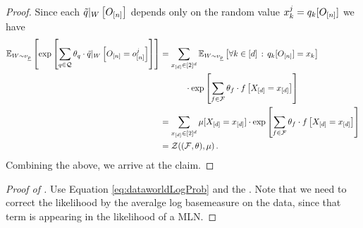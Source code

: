 \begin{proof}
	Since each ${\tilde{q}}|_{W} \left[O_{[n]}\right]$ depends only on the random value $x_{k}^j=q_{k}[O_{[n]}]$ we have
	\begin{align*}
		\mathbb{E}_{W\sim\nu_{\underline{p}}}\left[
			\mathrm{exp}\left[ \sum_{q\in\mathcal{Q}} \theta_{q} \cdot {\tilde{q}}|_{W} \left[O_{[n]} = o_{[n]}^{j}\right] \right] 
		\right] 
		& = \sum_{x_{[d]} \in [2]^d} 
		\mathbb{E}_{W\sim\nu_{\underline{p}}}\left[\forall {k\in[d]} \, : \, q_{k}[O_{[n]}]=x_{k}\right] \\
		& \quad \quad \quad  \cdot 
		\mathrm{exp}\left[\sum_{f\in\mathcal{F}} \theta_{f} \cdot f\left[X_{[d]}=x_{[d]}\right]\right]
		 \\
		& = \sum_{x_{[d]} \in [2]^d} \mu[X_{[d]}=x_{[d]}] \cdot 
		\mathrm{exp}\left[\sum_{f\in\mathcal{F}} \theta_{f} \cdot f\left[X_{[d]}=x_{[d]}\right]\right]
		 \\
		& = \mathcal{Z}{\left((\mathcal{F},\theta), \mu\right)} \, . 
	\end{align*}
	Combining the above, we arrive at the claim.
\end{proof}

\begin{proof}[Proof of ]
	Use Equation \ref{eq:dataworldLogProb} and the .
	Note that we need to correct the likelihood by the averalge log basemeasure on the data, since that term is appearing in the likelihood of a MLN.
\end{proof}


